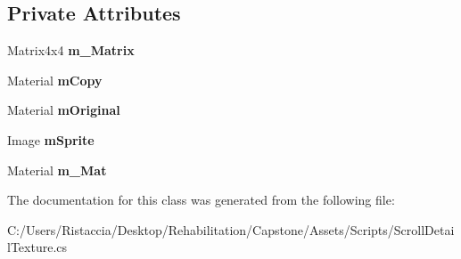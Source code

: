 \subsection*{Private Attributes}
\begin{DoxyCompactItemize}
\item 
\mbox{\label{class_scroll_detail_texture_a7c5b515d27ec5ec0d11ffe98440de17c}} 
Matrix4x4 {\bfseries m\+\_\+\+Matrix}
\item 
\mbox{\label{class_scroll_detail_texture_a27c90bf57e67d8df105813823ddcb8a9}} 
Material {\bfseries m\+Copy}
\item 
\mbox{\label{class_scroll_detail_texture_ae894fecb1f7bbb86c87e7d9efe850baf}} 
Material {\bfseries m\+Original}
\item 
\mbox{\label{class_scroll_detail_texture_aa31896bfddebda4cdd5adfac7fbb3d2d}} 
Image {\bfseries m\+Sprite}
\item 
\mbox{\label{class_scroll_detail_texture_a3cc09ea73ef1ee9052fdbc244fce77a0}} 
Material {\bfseries m\+\_\+\+Mat}
\end{DoxyCompactItemize}


The documentation for this class was generated from the following file\+:\begin{DoxyCompactItemize}
\item 
C\+:/\+Users/\+Ristaccia/\+Desktop/\+Rehabilitation/\+Capstone/\+Assets/\+Scripts/Scroll\+Detail\+Texture.\+cs\end{DoxyCompactItemize}
